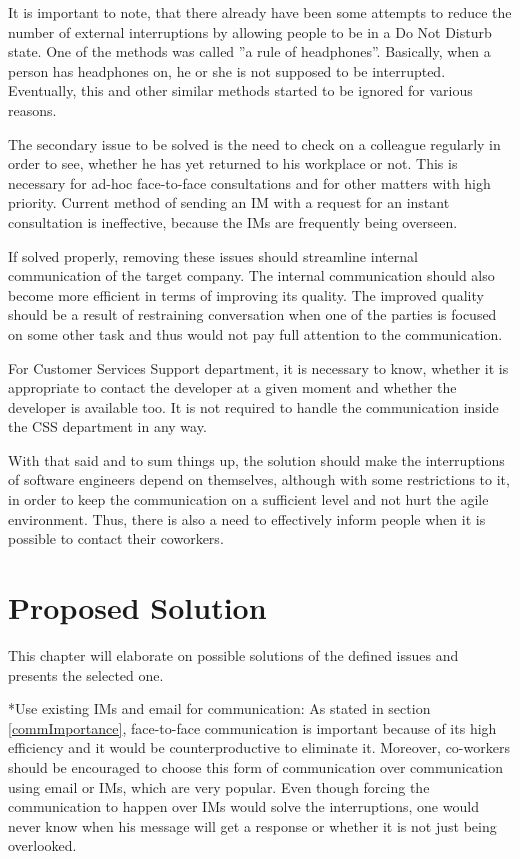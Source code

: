 \documentclass[11pt,singleside]{myfithesis2}
\makeatletter
\renewcommand\paragraph{
   \vspace{-10pt}
   \@startsection{paragraph}{4}{0mm}
      {\baselineskip}
      {- 5pt}
      {\normalfont\normalsize\bfseries}
}
\makeatother
\begin{document}
It is important to note, that there already have been some attempts to reduce the number of external interruptions by allowing people to be in a Do Not Disturb state. One of the methods was called ''a rule of headphones''. Basically, when a person has headphones on, he or she is not supposed to be interrupted. Eventually, this and other similar methods started to be ignored for various reasons.

The secondary issue to be solved is the need to check on a colleague regularly in order to see, whether he has yet returned to his workplace or not. This is necessary for ad-hoc face-to-face consultations and for other matters with high priority. Current method of sending an IM with a request for an instant consultation is ineffective, because the IMs are frequently being overseen.

If solved properly, removing these issues should streamline internal communication of the target company. The internal communication should also become more efficient in terms of improving its quality. The improved quality should be a result of restraining conversation when one of the parties is focused on some other task and thus would not pay full attention to the communication.

For Customer Services Support department, it is necessary to know, whether it is appropriate to contact the developer at a given moment and whether the developer is available too. It is not required to handle the communication inside the CSS department in any way.

With that said and to sum things up, the solution should make the interruptions of software engineers depend on themselves, although with some restrictions to it, in order to keep the communication on a sufficient level and not hurt the agile environment. Thus, there is also a need to effectively inform people when it is possible to contact their coworkers.


\chapter{Proposed Solution}
This chapter will elaborate on possible solutions of the defined issues and presents the selected one.

\paragraph*{Use existing IMs and email for communication: } As stated in section \ref{commImportance}, face-to-face communication is important because of its high efficiency and it would be counterproductive to eliminate it. Moreover, co-workers should be encouraged to choose this form of communication over communication using email or IMs, which are very popular. Even though forcing the communication to happen over IMs would solve the interruptions, one would never know when his message will get a response or whether it is not just being overlooked.
\end{document}
